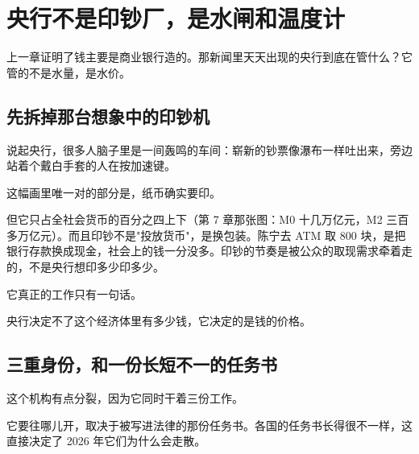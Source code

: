 \chapter{央行不是印钞厂，是水闸和温度计}

\begin{ledetext}
上一章证明了钱主要是商业银行造的。那新闻里天天出现的央行到底在管什么？它管的不是水量，是水价。
\end{ledetext}

\section{先拆掉那台想象中的印钞机}

说起央行，很多人脑子里是一间轰鸣的车间：崭新的钞票像瀑布一样吐出来，旁边站着个戴白手套的人在按加速键。

这幅画里唯一对的部分是，纸币确实要印。

但它只占全社会货币的百分之四上下（第 7 章那张图：M0 十几万亿元，M2 三百多万亿元）。而且印钞不是"投放货币"，是换包装。陈宁去 ATM 取 800 块，是把银行存款换成现金，社会上的钱一分没多。印钞的节奏是被公众的取现需求牵着走的，不是央行想印多少印多少。

它真正的工作只有一句话。

\begin{pullquote}{}
央行决定不了这个经济体里有多少钱，它决定的是钱的价格。
\end{pullquote}

\section{三重身份，和一份长短不一的任务书}

这个机构有点分裂，因为它同时干着三份工作。

\begin{flowlist}
\end{flowlist}

它要往哪儿开，取决于被写进法律的那份任务书。各国的任务书长得很不一样，这直接决定了 2026 年它们为什么会走散。

